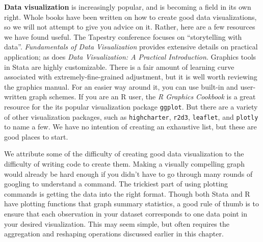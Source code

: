 \textbf{Data visualization} 
is increasingly popular,
and is becoming a field in its own right.\cite{healy2018data,wilke2019fundamentals}
Whole books have been written on how to create good data visualizations,
so we will not attempt to give you advice on it.
Rather, here are a few resources we have found useful.
The Tapestry conference focuses on ``storytelling with data''.
\textit{Fundamentals of Data Visualization} provides extensive details on practical application;
as does \textit{Data Visualization: A Practical Introduction}.
Graphics tools in Stata are highly customizable.
There is a fair amount of learning curve associated with
extremely-fine-grained adjustment,
but it is well worth reviewing the graphics manual.
For an easier way around it, 
you can use built-in and user-written graph schemes.\sidenote{
	\textcolor{red}{add link to the wiki}}
If you are an R user, the \textit{R Graphics Cookbook}
is a great resource for the its popular visualization package \texttt{ggplot}.
But there are a variety of other visualization packages,
such as \texttt{highcharter}, \texttt{r2d3}, \texttt{leaflet},
and \texttt{plotly} to name a few. 
We have no intention of creating an exhaustive list,
but these are good places to start.

We attribute some of the difficulty of creating good data visualization
to the difficulty of writing code to create them.
Making a visually compelling graph would already be hard enough if
you didn't have to go through many rounds of googling to understand a command.
The trickiest part of using plotting commands is getting the data into the right format.
Though both Stata and R have plotting functions that graph summary statistics,
a good rule of thumb is to ensure that each
observation in your dataset corresponds to one data point in your desired visualization.
This may seem simple,
but often requires the aggregation and reshaping operations
discussed earlier in this chapter.

